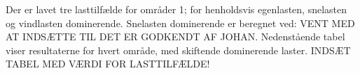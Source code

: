 Der er lavet tre lasttilfælde for områder 1; for henholdsvis egenlasten, snelasten og vindlasten dominerende. Snelasten dominerende er beregnet ved: VENT MED AT INDSÆTTE TIL DET ER GODKENDT AF JOHAN. 
\newline
\newline
Nedenstående tabel viser resultaterne for hvert område, med skiftende dominerende laster.
\newline
\newline
INDSÆT TABEL MED VÆRDI FOR LASTTILFÆLDE!
\newline
\newline